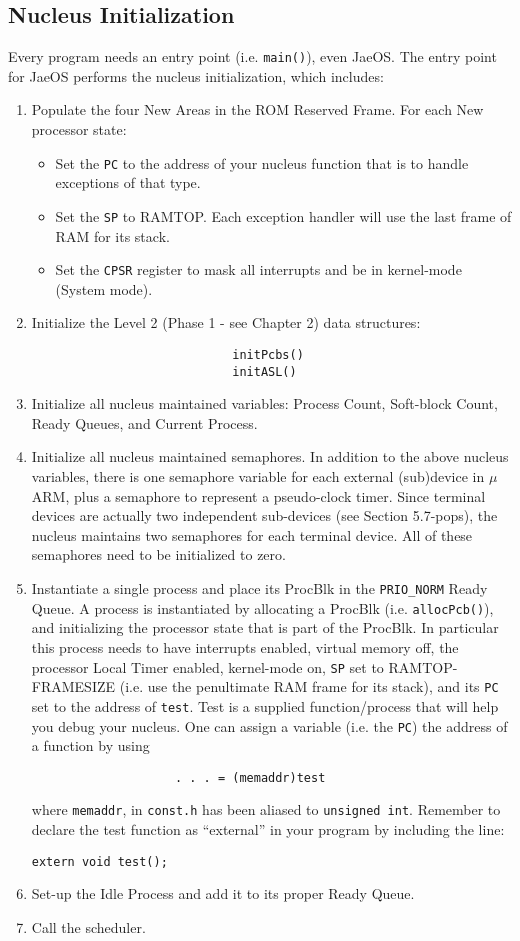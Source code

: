\subsection{Nucleus Initialization}
Every program needs an entry point (i.e. \verb+main()+), even JaeOS. The entry point
for JaeOS performs the nucleus initialization, which includes:
\begin{enumerate}
\item
Populate the four New Areas in the ROM Reserved Frame.
For each New processor state:
\begin{itemize}
\item Set the \verb+PC+ to the address of your nucleus function that is to handle
exceptions of that type.
\item Set the \verb+SP+ to RAMTOP. Each exception handler will use the last
frame of RAM for its stack.
\item Set the \verb+CPSR+ register to mask all interrupts and be in kernel-mode (System mode).
\end{itemize}
\item Initialize the Level 2 (Phase 1 - see Chapter 2) data structures:
\begin{verbatim}
							initPcbs()
							initASL()
\end{verbatim}
\item Initialize all nucleus maintained variables: Process Count, Soft-block Count,
Ready Queues, and Current Process.
\item Initialize all nucleus maintained semaphores. In addition to the above nucleus variables, there is one semaphore variable for each external (sub)device
in $\mu$ARM, plus a semaphore to represent a pseudo-clock timer. Since terminal devices are 
actually two independent sub-devices (see Section 5.7-pops), the nucleus maintains two semaphores for each terminal device. All
of these semaphores need to be initialized to zero.
\item Instantiate a single process and place its ProcBlk in the \verb+PRIO_NORM+ Ready Queue. A
process is instantiated by allocating a ProcBlk (i.e.
\verb+allocPcb()+), and
initializing the processor state that is part of the ProcBlk. In particular this
process needs to have interrupts enabled, virtual memory off, the processor
Local Timer enabled, kernel-mode on, \verb+SP+ set to RAMTOP-FRAMESIZE
(i.e. use the penultimate RAM frame for its stack), and its \verb+PC+ set to the
address of \verb+test+. Test is a supplied function/process that will help you
debug your nucleus. One can assign a variable (i.e. the \verb+PC+) the address of
a function by using
\begin{verbatim}
					. . . = (memaddr)test
\end{verbatim}
where \verb+memaddr+, in \verb+const.h+ has been aliased to \verb+unsigned int+.
Remember to declare the test function as “external” in your program by
including the line:
\begin{verbatim}
extern void test();
\end{verbatim}
\item Set-up the Idle Process and add it to its proper Ready Queue.
\item Call the scheduler.
\end{enumerate}
